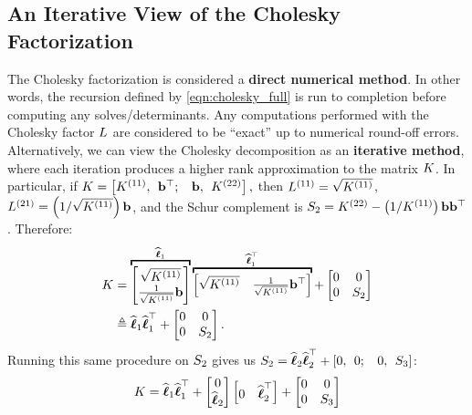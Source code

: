 \subsection{An Iterative View of the Cholesky Factorization}
The Cholesky factorization is considered a {\bf direct numerical method}.
In other words, the recursion defined by \cref{eqn:cholesky_full} is run to completion before computing any solves/determinants.
Any computations performed with the Cholesky factor $L$ are considered to be ``exact'' up to numerical round-off errors.
Alternatively, we can view the Cholesky decomposition as an {\bf iterative method}, where each iteration produces a higher rank approximation to the matrix $K$.
In particular, if  $ K = \left[ K^{(11)}, \:\: \mathbf{b}^{\top}; \:\:\:\: \mathbf{b}, \:\: K^{(22)} \right], $
then $L^{(11)} = \sqrt{K^{(11)}}$, $L^{(21)} = \left( 1 / \sqrt{K^{(11)}} \right) \mathbf{b}$, and the Schur complement is $S_2 = K^{(22)} - \left(1/ K^{(11)} \right) \mathbf{b} \mathbf{b}^{\top}$.
Therefore:
%
\begin{align}
  \bK &=
    \overbracket{\begin{bmatrix} \sqrt{ K^{(11)} } \\ \frac{1}{\sqrt{K^{(11)}}} \bb \end{bmatrix}}^{\widehat \bl_1}
    \overbracket{\begin{bmatrix} \sqrt{ K^{(11)} } & \frac{1}{\sqrt{K^{(11)}}} \bb^\top \end{bmatrix}}^{\widehat \bl_1^\top}
    +
    \begin{bmatrix} 0 & 0 \\ 0 & \bS_2 \end{bmatrix}
  \nonumber \\
  &\triangleq \widehat \bl_{1} \widehat \bl_{1}^{\top} + \begin{bmatrix} 0 & 0 \\ 0 & \bS_2 \end{bmatrix}
  \label{eqn:chol_incomplete}.
\end{align}
%
Running this same procedure on $S_2$ gives us $S_2 = \widehat {\boldsymbol{\ell}}_{2} \widehat {\boldsymbol{\ell}}_{2}^{\top} + \left[0, \:\: 0; \:\:\:\: 0, \:\: S_3 \right]$:
%
\begin{align*}
  K  = \widehat {\boldsymbol{\ell}}_{1} \widehat {\boldsymbol{\ell}}_{1}^{\top} + \begin{bmatrix} 0 \\ \widehat {\boldsymbol{\ell}}_{2} \end{bmatrix} \begin{bmatrix} 0 & \widehat {\boldsymbol{\ell}}_2^\top \end{bmatrix} +
  \begin{bmatrix} 0 & 0 \\ 0 & S_3 \end{bmatrix}
\end{align*}
